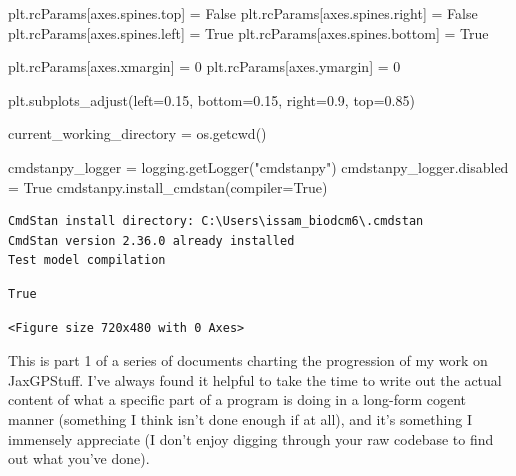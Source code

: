 \documentclass[
  letterpaper,
  DIV=11,
  numbers=noendperiod]{scrartcl}
\newenvironment{Shaded}{\begin{snugshade}}{\end{snugshade}}
\newcommand{\DecValTok}[1]{\textcolor[rgb]{0.68,0.00,0.00}{#1}}
\newcommand{\FloatTok}[1]{\textcolor[rgb]{0.68,0.00,0.00}{#1}}
\newcommand{\NormalTok}[1]{\textcolor[rgb]{0.00,0.23,0.31}{#1}}
\newcommand{\OperatorTok}[1]{\textcolor[rgb]{0.37,0.37,0.37}{#1}}
\newcommand{\StringTok}[1]{\textcolor[rgb]{0.13,0.47,0.30}{#1}}
\newcommand{\VariableTok}[1]{\textcolor[rgb]{0.07,0.07,0.07}{#1}}
\begin{document}
\begin{Shaded}
\begin{Highlighting}[]
\NormalTok{plt.rcParams[}\StringTok{\textquotesingle{}axes.spines.top\textquotesingle{}}\NormalTok{] }\OperatorTok{=} \VariableTok{False}
\NormalTok{plt.rcParams[}\StringTok{\textquotesingle{}axes.spines.right\textquotesingle{}}\NormalTok{] }\OperatorTok{=} \VariableTok{False}
\NormalTok{plt.rcParams[}\StringTok{\textquotesingle{}axes.spines.left\textquotesingle{}}\NormalTok{] }\OperatorTok{=} \VariableTok{True}
\NormalTok{plt.rcParams[}\StringTok{\textquotesingle{}axes.spines.bottom\textquotesingle{}}\NormalTok{] }\OperatorTok{=} \VariableTok{True}

\NormalTok{plt.rcParams[}\StringTok{\textquotesingle{}axes.xmargin\textquotesingle{}}\NormalTok{] }\OperatorTok{=} \DecValTok{0}
\NormalTok{plt.rcParams[}\StringTok{\textquotesingle{}axes.ymargin\textquotesingle{}}\NormalTok{] }\OperatorTok{=} \DecValTok{0}

\NormalTok{plt.subplots\_adjust(left}\OperatorTok{=}\FloatTok{0.15}\NormalTok{, bottom}\OperatorTok{=}\FloatTok{0.15}\NormalTok{, right}\OperatorTok{=}\FloatTok{0.9}\NormalTok{, top}\OperatorTok{=}\FloatTok{0.85}\NormalTok{)}

\NormalTok{current\_working\_directory }\OperatorTok{=}\NormalTok{ os.getcwd()}

\NormalTok{cmdstanpy\_logger }\OperatorTok{=}\NormalTok{ logging.getLogger(}\StringTok{"cmdstanpy"}\NormalTok{)}
\NormalTok{cmdstanpy\_logger.disabled }\OperatorTok{=} \VariableTok{True}
\NormalTok{cmdstanpy.install\_cmdstan(compiler}\OperatorTok{=}\VariableTok{True}\NormalTok{)}
\end{Highlighting}
\end{Shaded}

\begin{verbatim}
CmdStan install directory: C:\Users\issam_biodcm6\.cmdstan
CmdStan version 2.36.0 already installed
Test model compilation
\end{verbatim}

\begin{verbatim}
True
\end{verbatim}

\begin{verbatim}
<Figure size 720x480 with 0 Axes>
\end{verbatim}

This is part 1 of a series of documents charting the progression of my
work on JaxGPStuff. I've always found it helpful to take the time to
write out the actual content of what a specific part of a program is
doing in a long-form cogent manner (something I think isn't done enough
if at all), and it's something I immensely appreciate (I don't enjoy
digging through your raw codebase to find out what you've done).
\end{document}
